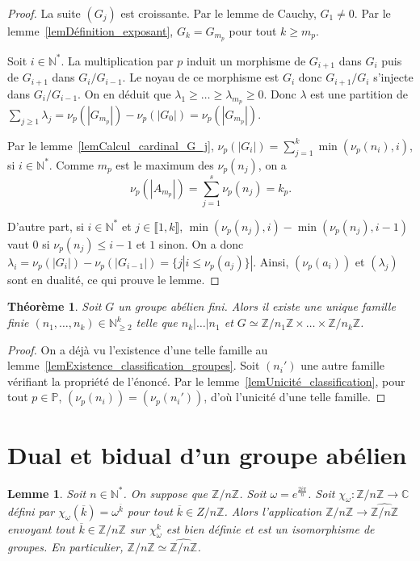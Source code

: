 \documentclass[a4paper]{article}
\theoremstyle{definition} %
\theoremstyle{plain} %
\newtheorem{Lem}[Def]{Lemme} %
\newtheorem{Thm}[Def]{Théorème} %
\theoremstyle{remark} %
\newcommand{\C}{\mathbb{C}}
\newcommand{\N}{\mathbb{N}}
\newcommand{\Z}{\mathbb{Z}}
\newcommand{\p}{\mathbb{P}}
\begin{document}
\begin{proof}
La suite $(G_j)$ est croissante. Par le lemme de Cauchy, $G_1\neq 0$. Par le lemme~\ref{lemDéfinition_exposant}, $G_k=G_{m_p}$ pour tout $k\geq m_p$. 

Soit $i\in \N^*$. La multiplication par $p$ induit un morphisme de $G_{i+1}$ dans $G_{i}$ puis de $G_{i+1}$ dans $G_i/G_{i-1}$. Le noyau de ce morphisme est $G_{i}$ donc $G_{i+1}/G_i$ s'injecte dans $G_i/G_{i-1}$. On en déduit que $\lambda_1\geq \ldots\geq \lambda_{m_p}\geq 0$. Donc $\lambda$ est une partition de $\sum_{j\geq 1}\lambda_j=\nu_p(|G_{m_p}|)-\nu_p(|G_0|)=\nu_p(|G_{m_p}|)$.

Par le lemme~\ref{lemCalcul_cardinal_G_j}, $\nu_p(|G_i|)=\sum_{j=1}^k \min(\nu_p(n_i),i)$, si $i\in \N^*$. Comme $m_p$ est le maximum des $\nu_p(n_j)$, on a \[\nu_p(|A_{m_p}|)=\sum_{j=1}^s\nu_p(n_j)=k_p.\]

D'autre part, si $i\in \N^*$ et $j\in \llbracket 1,k\rrbracket$, $\min(\nu_p(n_j),i)-\min(\nu_p(n_j),i-1)$ vaut $0$ si $\nu_p(n_j)\leq i-1$ et $1$ sinon. On a donc $\lambda_i=\nu_p(|G_i|)-\nu_p(|G_{i-1}|)=\{j|i\leq \nu_p(a_j)\}|$. Ainsi, $(\nu_p(a_i))$ et $(\lambda_j)$ sont en dualité, ce qui prouve le lemme.
\end{proof}

\begin{Thm}\label{thmClassification_groupes_finis}
Soit $G$ un groupe abélien fini. Alors il existe une unique famille finie $(n_1,\ldots,n_k)\in \N_{\geq 2}^k$ telle que $n_k|\ldots |n_1$ et $G\simeq \Z/n_1\Z\times \ldots\times \Z/n_k\Z$.
\end{Thm}

\begin{proof}
On a déjà vu l'existence d'une telle famille au lemme~\ref{lemExistence_classification_groupes}. Soit $(n_i')$ une autre famille vérifiant la propriété de l'énoncé. Par le lemme~\ref{lemUnicité_classification}, pour tout $p\in \p$, $(\nu_p(n_i))=(\nu_p(n_i'))$, d'où l'unicité d'une telle famille.
\end{proof}

\section{Dual et bidual d'un groupe abélien}

\begin{Lem}\label{lemDual_groupe_cyclique}
Soit $n\in \N^*$. On suppose que $\Z/n\Z$. Soit $\omega=e^{\frac{2i\pi}{n}}$. Soit $\chi_\omega:\Z/n\Z\rightarrow \C$ défini par $\chi_\omega(\overline{k})=\omega^{\overline{k}}$ pour tout $\overline{k}\in Z/n\Z$. Alors l'application $\Z/n\Z\rightarrow \widehat{\Z/n\Z}$ envoyant tout $\overline{k}\in \Z/n\Z$ sur $\chi_{\omega}^{k}$ est bien définie et est un isomorphisme de groupes. En particulier, $\Z/n\Z\simeq \widehat{\Z/n\Z}$.
\end{Lem}
\end{document}

